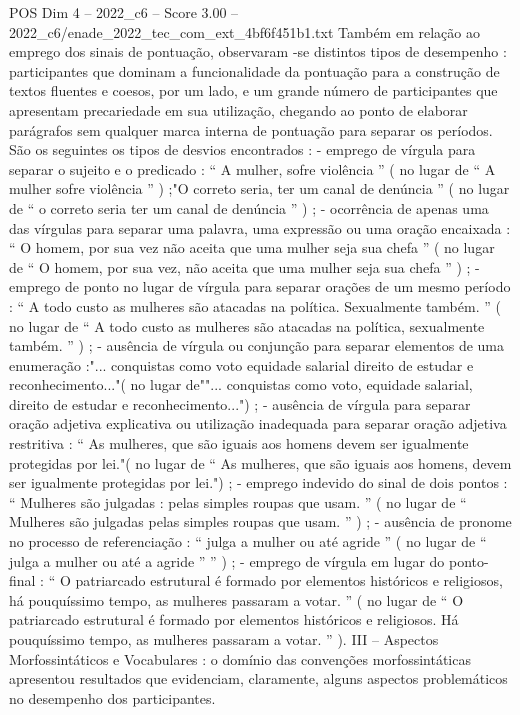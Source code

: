 \begin{textsample}{POS Dim 4 – 2022\_c6 – Score 3.00 – 2022\_c6/enade\_2022\_tec\_com\_ext\_4bf6f451b1.txt}
Também em relação ao emprego dos sinais de pontuação, observaram -se distintos tipos de desempenho : participantes que dominam a funcionalidade da pontuação para a construção de textos fluentes e coesos, por um lado, e um grande número de participantes que apresentam precariedade em sua utilização, chegando ao ponto de elaborar parágrafos sem qualquer marca interna de pontuação para separar os períodos.
São os seguintes os tipos de desvios encontrados : - emprego de vírgula para separar o sujeito e o predicado : “ A mulher, sofre violência ” ( no lugar de “ A mulher sofre violência ” ) ;"O correto seria, ter um canal de denúncia ” ( no lugar de “ o correto seria ter um canal de denúncia ” ) ; - ocorrência de apenas uma das vírgulas para separar uma palavra, uma expressão ou uma oração encaixada : “ O homem, por sua vez não aceita que uma mulher seja sua chefa ” ( no lugar de “ O homem, por sua vez, não aceita que uma mulher seja sua chefa ” ) ; - emprego de ponto no lugar de vírgula para separar orações de um mesmo período : “ A todo custo as mulheres são atacadas na política.
Sexualmente também. ” ( no lugar de “ A todo custo as mulheres são atacadas na política, sexualmente também. ” ) ; - ausência de vírgula ou conjunção para separar elementos de uma enumeração :"... conquistas como voto equidade salarial direito de estudar e reconhecimento..."( no lugar de""... conquistas como voto, equidade salarial, direito de estudar e reconhecimento...") ; - ausência de vírgula para separar oração adjetiva explicativa ou utilização inadequada para separar oração adjetiva restritiva : “ As mulheres, que são iguais aos homens devem ser igualmente protegidas por lei."( no lugar de “ As mulheres, que são iguais aos homens, devem ser igualmente protegidas por lei.") ; - emprego indevido do sinal de dois pontos : “ Mulheres são julgadas : pelas simples roupas que usam. ” ( no lugar de “ Mulheres são julgadas pelas simples roupas que usam. ” ) ; - ausência de pronome no processo de referenciação : “ julga a mulher ou até agride ” ( no lugar de “ julga a mulher ou até a agride ” ” ) ; - emprego de vírgula em lugar do ponto-final : “ O patriarcado estrutural é formado por elementos históricos e religiosos, há pouquíssimo tempo, as mulheres passaram a votar. ” ( no lugar de “ O patriarcado estrutural é formado por elementos históricos e religiosos.
Há pouquíssimo tempo, as mulheres passaram a votar. ” ).
III – Aspectos Morfossintáticos e Vocabulares : o domínio das convenções morfossintáticas apresentou resultados que evidenciam, claramente, alguns aspectos problemáticos no desempenho dos participantes.

\end{textsample}
